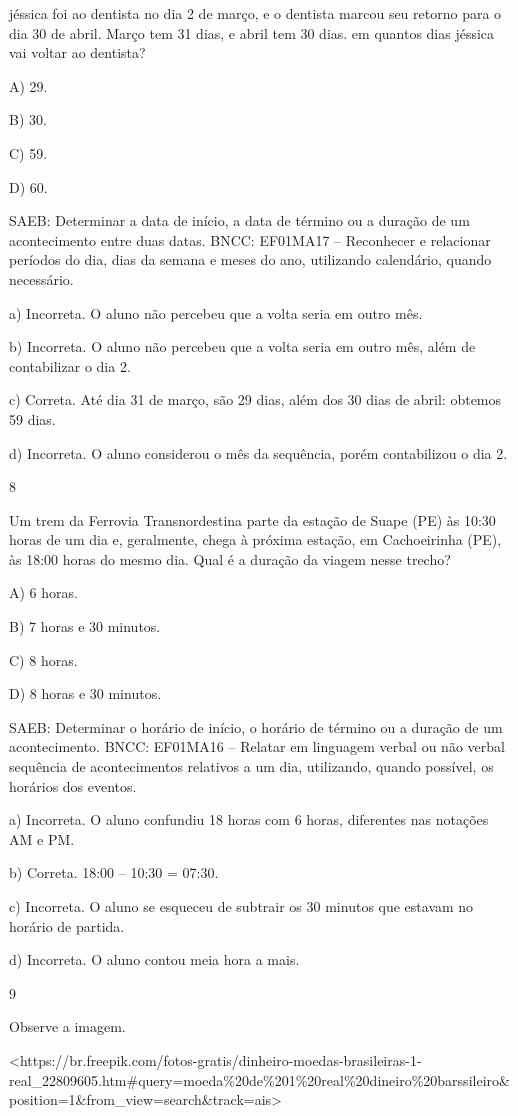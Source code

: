 jéssica foi ao dentista no dia 2 de março, e o dentista marcou seu
retorno para o dia 30 de abril. Março tem 31 dias, e abril tem 30 dias. em quantos dias jéssica vai voltar ao dentista?

A) 29.

B) 30.

C) 59.

D) 60.

SAEB: Determinar a data de início, a data de término ou a
duração de um acontecimento entre duas datas.
BNCC: EF01MA17 -- Reconhecer e relacionar períodos do dia, dias da semana
e meses do ano, utilizando calendário, quando necessário.

a) Incorreta. O aluno não percebeu que a volta seria em outro mês.

b) Incorreta. O aluno não percebeu que a volta seria em outro mês, além
de contabilizar o dia 2.

c) Correta. Até dia 31 de março, são 29 dias, além dos 30 dias de abril: obtemos
59 dias.

d) Incorreta. O aluno considerou o mês da sequência, porém contabilizou
o dia 2.

\num{8}

Um trem da Ferrovia Transnordestina parte da estação de Suape (PE) às 10:30 horas de um dia e, geralmente, chega à próxima estação, em Cachoeirinha (PE), às 18:00 horas do mesmo dia. Qual é a duração da viagem nesse trecho?

A) 6 horas.

B) 7 horas e 30 minutos.

C) 8 horas.

D) 8 horas e 30 minutos.

SAEB: Determinar o horário de início, o horário de término ou a
duração de um acontecimento.
BNCC: EF01MA16 -- Relatar em linguagem verbal ou não verbal sequência de
acontecimentos relativos a um dia, utilizando, quando possível, os
horários dos eventos.

a) Incorreta. O aluno confundiu 18 horas com 6 horas, diferentes nas notações AM e PM.

b) Correta. 18:00 -- 10:30 = 07:30.

c) Incorreta. O aluno se esqueceu de subtrair os 30 minutos que estavam no horário de partida.

d) Incorreta. O aluno contou meia hora a mais.

\num{9}

Observe a imagem.

\textless{}https://br.freepik.com/fotos-gratis/dinheiro-moedas-brasileiras-1-real\_22809605.htm\#query=moeda\%20de\%201\%20real\%20dineiro\%20barssileiro\&position=1\&from\_view=search\&track=ais\textgreater{}

